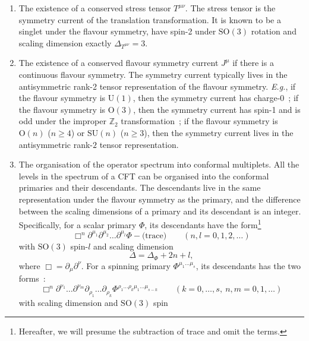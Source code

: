 \documentclass{timesjhep}
\begin{document}
\begin{enumerate}
    \item The existence of a conserved stress tensor $T^{\mu\nu}$. The stress tensor is the symmetry current of the translation transformation. It is known to be a singlet under the flavour symmetry, have spin-2 under $\mathrm{SO}(3)$ rotation and scaling dimension exactly $\Delta_{T^{\mu\nu}}=3$.
    \item The existence of a conserved flavour symmetry current $J^\mu$ if there is a continuous flavour symmetry. The symmetry current typically lives in the antisymmetric rank-2 tensor representation of the flavour symmetry. \textit{E.g.}, if the flavour symmetry is $\mathrm{U}(1)$, then the symmetry current has charge-0~; if the flavour symmetry is $\mathrm{O}(3)$, then the symmetry current has spin-1 and is odd under the improper $\mathbb{Z}_2$ transformation~; if the flavour symmetry is $\mathrm{O}(n)$ ($n\ge 4$) or $\mathrm{SU}(n)$ ($n\ge 3$), then the symmetry current lives in the antisymmetric rank-$2$ tensor representation.
    \item The organisation of the operator spectrum into conformal multiplets. All the levels in the spectrum of a CFT can be organised into the conformal primaries and their descendants. The descendants live in the same representation under the flavour symmetry as the primary, and the difference between the scaling dimensions of a primary and its descendant is an integer. Specifically, for a scalar primary $\Phi$, its descendants have the form\footnote{Hereafter, we will presume the subtraction of trace and omit the terms.}
    \begin{equation*}
        \Box^n\partial^{\mu_1}\partial^{\mu_2}\dots\partial^{\mu_l}\Phi-\textrm{(trace)}\qquad (n,l=0,1,2,\dots)
    \end{equation*}
    with $\mathrm{SO}(3)$ spin-$l$ and scaling dimension 
    \begin{equation*}
        \Delta=\Delta_\Phi+2n+l,
    \end{equation*}
    where $\Box=\partial_\mu\partial^\nu$. For a spinning primary $\Phi^{\mu_1\dots\mu_s}$, its descendants has the two forms~:
    \begin{equation*}
        \Box^n\partial^{\nu_1}\dots\partial^{\nu_m}\partial_{\rho_1}\dots\partial_{\rho_k}\Phi^{\rho_1\dots\rho_{k}\mu_1\dots \mu_{s-k}}\qquad (k=0,\dots,s,\ n,m=0,1,\dots)
    \end{equation*}
    with scaling dimension and $\mathrm{SO}(3)$ spin
    \begin{equation*}

\end{equation*}
\end{enumerate}
\end{document}
